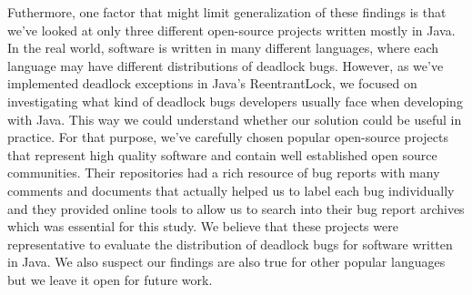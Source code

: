 Futhermore, one factor that might limit generalization of these findings is that we've looked at only three different open-source projects written mostly in Java.
In the real world, software is written in many different languages, where each language may have different distributions of deadlock bugs.
However, as we've implemented deadlock exceptions in Java's ReentrantLock, we focused on investigating what kind of deadlock bugs developers usually face when developing with Java.
This way we could understand whether our solution could be useful in practice.
For that purpose, we've carefully chosen popular open-source projects that represent high quality software and contain well established open source communities.
Their repositories had a rich resource of bug reports with many comments and documents that actually helped us to label each bug individually and they provided
online tools to allow us to search into their bug report archives which was essential for this study.
We believe that these projects were representative to evaluate the distribution of deadlock bugs for software written in Java.
We also suspect our findings are also true for other popular languages but we leave it open for future work.


